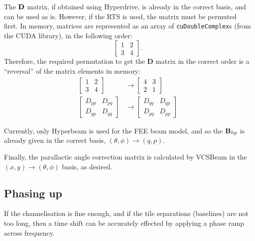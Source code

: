 \documentclass{book}
\newcommand{\vcsbeam}{{\sc VCSBeam}}
\begin{document}
The ${\bf D}$ matrix, if obtained using Hyperdrive, is already in the correct basis, and can be used as is.
However, if the RTS is used, the matrix must be permuted first.
In memory, matrices are represented as an array of \texttt{cuDoubleComplex}s (from the CUDA library), in the following order:
\begin{equation}
    \begin{bmatrix} 1 & 2 \\ 3 & 4 \end{bmatrix}.
\end{equation}
Therefore, the required permutation to get the {\bf D} matrix in the correct order is a ``reversal'' of the matrix elements in memory:
\begin{equation}
    \begin{aligned}
        \begin{bmatrix} 1 & 2 \\ 3 & 4 \end{bmatrix}
            &\rightarrow
            \begin{bmatrix} 4 & 3 \\ 2 & 1 \end{bmatrix} \\
        \begin{bmatrix} D_{pp} & D_{pq} \\ D_{qp} & D_{qq} \end{bmatrix}
            &\rightarrow
            \begin{bmatrix} D_{qq} & D_{qp} \\ D_{pq} & D_{pp} \end{bmatrix}
    \end{aligned}
\end{equation}

Currently, only Hyperbeam is used for the FEE beam model, and so the ${\bf B}_{hp}$ is already given in the correct basis, $(\theta,\phi)\rightarrow(q,p)$.

Finally, the parallactic angle correction matrix is calculated by \vcsbeam{} in the $(x,y)\rightarrow(\theta,\phi)$ basis, as desired.

\subsection{Phasing up}

If the channelisation is fine enough, and if the tile separations (baselines) are not too long, then a time shift can be accurately effected by applying a phase ramp across frequency.
\end{document}
